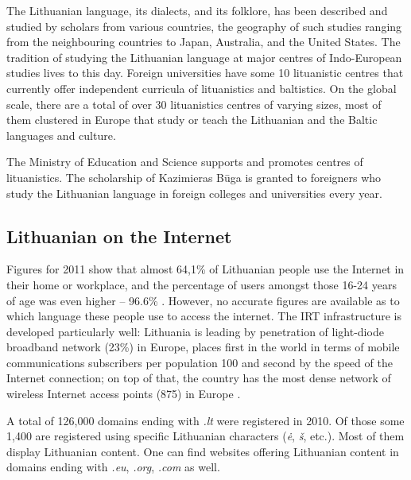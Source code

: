 \documentclass[]{../metanetpaper}
\begin{document}
\begin{multicols}{2}

The Lithuanian language, its dialects, and its folklore, has been described and studied by scholars from various countries, the geography of such studies ranging from the neighbouring countries to Japan, Australia, and the United States. The tradition of studying the Lithuanian language at major centres of Indo-European studies lives to this day. Foreign universities have some 10 lituanistic centres that currently offer independent curricula of lituanistics and baltistics. On the global scale, there are a total of over 30 lituanistics centres of varying sizes, most of them clustered in Europe that study or teach the Lithuanian and the Baltic languages and culture.

The Ministry of Education and Science supports and promotes centres of lituanistics. The scholarship of Kazimieras Būga is granted to foreigners who study the Lithuanian language in foreign colleges and universities every year.

\subsection{Lithuanian on the Internet}

 Figures for 2011 show that almost 64,1\% of Lithuanian people use the Internet in their home or workplace, and the percentage of users amongst those 16-24 years of age was even higher – 96.6\% \cite{stat}.  However, no accurate figures are available as to which language these people use to access the internet. The IRT infrastructure is developed particularly well: Lithuania is leading by penetration of light-diode broadband network (23\%) in Europe, places first in the world in terms of mobile communications subscribers per population 100 and second by the speed of the Internet connection; on top of that, the country has the most dense network of wireless Internet access points (875) in Europe \cite{invest}.


A total of 126,000 domains ending with \textit{.lt}  were registered in 2010. Of those some 1,400 are registered using specific Lithuanian characters (\textit{ė}, \textit{š}, etc.). Most of them display Lithuanian content. One can find websites offering Lithuanian content in domains ending with \textit{.eu}, \textit{.org}, \textit{.com} as well.


\end{multicols}
\end{document}
